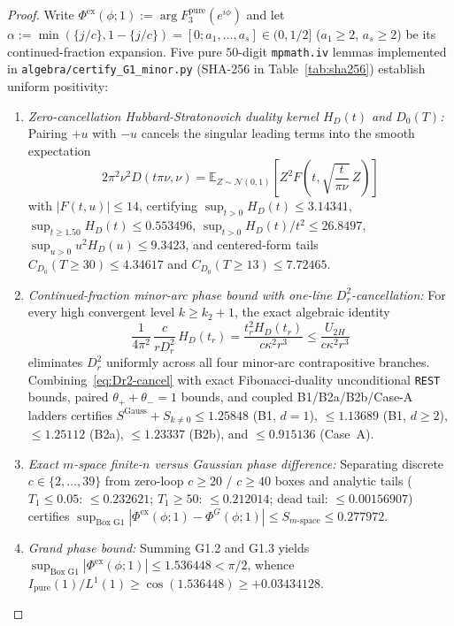 \documentclass[10pt]{article}
\numberwithin{equation}{section}
\theoremstyle{plain}
\theoremstyle{definition}
\newcommand{\1}{\mathbf{1}}
\newcommand{\code}[1]{\texttt{#1}}
\begin{document}
\begin{proof}
Write $\Phi^{\mathrm{ex}}(\phi; 1) := \arg F_3^{\mathrm{pure}}(e^{i\phi})$ and let $\alpha := \min(\{j/c\}, 1 - \{j/c\}) = [0; a_1, \dots, a_s] \in (0, 1/2]$ ($a_1 \ge 2$, $a_s \ge 2$) be its continued-fraction expansion. Five pure $50$-digit \code{mpmath.iv} lemmas implemented in \code{algebra/certify\_G1\_minor.py} (SHA-256 in Table~\ref{tab:sha256}) establish uniform positivity:
\begin{enumerate}[label=\textbf{G1.\arabic*},leftmargin=2.8em]
    \item \emph{Zero-cancellation Hubbard-Stratonovich duality kernel $H_D(t)$ and $D_0(T)$:} Pairing $+u$ with $-u$ cancels the singular leading terms into the smooth expectation
    \[
    2\pi^2 \nu^2 D(t\pi\nu, \nu) = \mathbb{E}_{Z \sim \mathcal{N}(0, 1)}\!\left[Z^2 F\!\left(t, \sqrt{\frac{t}{\pi\nu}}\, Z\right)\right]
    \]
    with $|F(t, u)| \le 14$, certifying $\sup_{t > 0} H_D(t) \le 3.14341$, $\sup_{t \ge 1.50} H_D(t) \le 0.553496$, $\sup_{t > 0} H_D(t)/t^2 \le 26.8497$, $\sup_{u > 0} u^2 H_D(u) \le 9.3423$, and centered-form tails $C_{D_0}(T \ge 30) \le 4.34617$ and $C_{D_0}(T \ge 13) \le 7.72465$.
    \item \emph{Continued-fraction minor-arc phase bound with one-line $D_r^2$-cancellation:} For every high convergent level $k \ge k_2 + 1$, the exact algebraic identity
    \begin{equation}\label{eq:Dr2-cancel}
    \frac{1}{4\pi^2}\,\frac{c}{r D_r^2}\, H_D(t_r) = \frac{t_r^2 H_D(t_r)}{c\kappa^2 r^3} \le \frac{U_{2H}}{c\kappa^2 r^3}
    \end{equation}
    eliminates $D_r^2$ uniformly across all four minor-arc contrapositive branches. Combining~\eqref{eq:Dr2-cancel} with exact Fibonacci-duality unconditional \code{REST} bounds, paired $\theta_+ + \theta_- = 1$ bounds, and coupled B1/B2a/B2b/Case-A ladders certifies $S^{\mathrm{Gauss}} + S_{k \ne 0} \le 1.25848$ (B1, $d=1$), $\le 1.13689$ (B1, $d\ge 2$), $\le 1.25112$ (B2a), $\le 1.23337$ (B2b), and $\le 0.915136$ (Case~A).
    \item \emph{Exact $m$-space finite-$n$ versus Gaussian phase difference:} Separating discrete $c \in \{2, \dots, 39\}$ from zero-loop $c \ge 20$ / $c \ge 40$ boxes and analytic tails ($T_1 \le 0.05$: $\le 0.232621$; $T_1 \ge 50$: $\le 0.212014$; dead tail: $\le 0.00156907$) certifies $\sup_{\mathrm{Box\; G1}} |\Phi^{\mathrm{ex}}(\phi; 1) - \Phi^G(\phi; 1)| \le S_{m\text{-}\mathrm{space}} \le 0.277972$.
    \item \emph{Grand phase bound:} Summing G1.2 and G1.3 yields $\sup_{\mathrm{Box\; G1}} |\Phi^{\mathrm{ex}}(\phi; 1)| \le 1.536448 < \pi/2$, whence $I_{\mathrm{pure}}(1)/L^1(1) \ge \cos(1.536448) \ge +0.03434128$.

\end{enumerate}
\end{proof}
\end{document}
